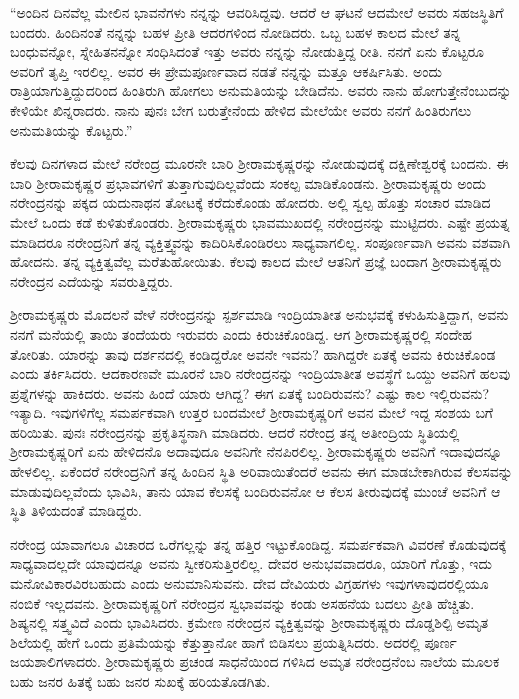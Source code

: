 “ಅಂದಿನ ದಿನವೆಲ್ಲ ಮೇಲಿನ ಭಾವನೆಗಳು ನನ್ನನ್ನು ಆವರಿಸಿದ್ದವು. ಆದರೆ ಆ ಘಟನೆ ಆದಮೇಲೆ ಅವರು ಸಹಜಸ್ಥಿತಿಗೆ ಬಂದರು. ಹಿಂದಿನಂತೆ ನನ್ನನ್ನು ಬಹಳ ಪ್ರೀತಿ ಆದರಗಳಿಂದ ನೋಡಿದರು. ಒಬ್ಬ ಬಹಳ ಕಾಲದ ಮೇಲೆ ತನ್ನ ಬಂಧುವನ್ನೋ, ಸ್ನೇಹಿತನನ್ನೋ ಸಂಧಿಸಿದಂತೆ ಇತ್ತು ಅವರು ನನ್ನನ್ನು ನೋಡುತ್ತಿದ್ದ ರೀತಿ. ನನಗೆ ಏನು ಕೊಟ್ಟರೂ ಅವರಿಗೆ ತೃಪ್ತಿ ಇರಲಿಲ್ಲ. ಅವರ ಈ ಪ್ರೇಮಪೂರ್ಣವಾದ ನಡತೆ ನನ್ನನ್ನು ಮತ್ತೂ ಆಕರ್ಷಿಸಿತು. ಅಂದು ರಾತ್ರಿಯಾಗುತ್ತಿದ್ದುದರಿಂದ ಹಿಂತಿರುಗಿ ಹೋಗಲು ಅನುಮತಿಯನ್ನು ಬೇಡಿದೆನು. ಅವರು ನಾನು ಹೋಗುತ್ತೇನೆಂಬುದನ್ನು ಕೇಳಿಯೇ ಖಿನ್ನರಾದರು. ನಾನು ಪುನಃ ಬೇಗ ಬರುತ್ತೇನೆಂದು ಹೇಳಿದ ಮೇಲೆಯೇ ಅವರು ನನಗೆ ಹಿಂತಿರುಗಲು ಅನುಮತಿಯನ್ನು ಕೊಟ್ಟರು.”

ಕೆಲವು ದಿನಗಳಾದ ಮೇಲೆ ನರೇಂದ್ರ ಮೂರನೇ ಬಾರಿ ಶ‍್ರೀರಾಮಕೃಷ್ಣರನ್ನು ನೋಡುವುದಕ್ಕೆ ದಕ್ಷಿಣೇಶ್ವರಕ್ಕೆ ಬಂದನು. ಈ ಬಾರಿ ಶ‍್ರೀರಾಮಕೃಷ್ಣರ ಪ್ರಭಾವಗಳಿಗೆ ತುತ್ತಾಗುವುದಿಲ್ಲವೆಂದು ಸಂಕಲ್ಪ ಮಾಡಿಕೊಂಡನು. ಶ‍್ರೀರಾಮಕೃಷ್ಣರು ಅಂದು ನರೇಂದ್ರನನ್ನು ಪಕ್ಕದ ಯದುನಾಥನ ತೋಟಕ್ಕೆ ಕರೆದುಕೊಂಡು ಹೋದರು. ಅಲ್ಲಿ ಸ್ವಲ್ಪ ಹೊತ್ತು ಸಂಚಾರ ಮಾಡಿದ ಮೇಲೆ ಒಂದು ಕಡೆ ಕುಳಿತುಕೊಂಡರು. ಶ‍್ರೀರಾಮಕೃಷ್ಣರು ಭಾವಮುಖದಲ್ಲಿ ನರೇಂದ್ರನನ್ನು ಮುಟ್ಟಿದರು. ಎಷ್ಟೇ ಪ್ರಯತ್ನ ಮಾಡಿದರೂ ನರೇಂದ್ರನಿಗೆ ತನ್ನ ವ್ಯಕ್ತಿತ್ತ್ವವನ್ನು ಕಾದಿರಿಸಿಕೊಂಡಿರಲು ಸಾಧ್ಯವಾಗಲಿಲ್ಲ. ಸಂಪೂರ್ಣವಾಗಿ ಅವನು ವಶವಾಗಿ ಹೋದನು. ತನ್ನ ವ್ಯಕ್ತಿತ್ವವೆಲ್ಲ ಮರೆತುಹೋಯಿತು. ಕೆಲವು ಕಾಲದ ಮೇಲೆ ಆತನಿಗೆ ಪ್ರಜ್ಞೆ ಬಂದಾಗ ಶ‍್ರೀರಾಮಕೃಷ್ಣರು ನರೇಂದ್ರನ ಎದೆಯನ್ನು ಸವರುತ್ತಿದ್ದರು.

ಶ‍್ರೀರಾಮಕೃಷ್ಣರು ಮೊದಲನೆ ವೇಳೆ ನರೇಂದ್ರನನ್ನು ಸ್ಪರ್ಶಮಾಡಿ ಇಂದ್ರಿಯಾತೀತ ಅನುಭವಕ್ಕೆ ಕಳುಹಿಸುತ್ತಿದ್ದಾಗ, ಅವನು ನನಗೆ ಮನೆಯಲ್ಲಿ ತಾಯಿ ತಂದೆಯರು ಇರುವರು ಎಂದು ಕಿರುಚಿಕೊಂಡಿದ್ದ. ಆಗ ಶ‍್ರೀರಾಮಕೃಷ್ಣರಲ್ಲಿ ಸಂದೇಹ ತೋರಿತು. ಯಾರನ್ನು ತಾವು ದರ್ಶನದಲ್ಲಿ ಕಂಡಿದ್ದರೋ ಅವನೇ ಇವನು? ಹಾಗಿದ್ದರೇ ಏತಕ್ಕೆ ಅವನು ಕಿರುಚಿಕೊಂಡ ಎಂದು ತರ್ಕಿಸಿದರು. ಆದಕಾರಣವೇ ಮೂರನೆ ಬಾರಿ ನರೇಂದ್ರನನ್ನು ಇಂದ್ರಿಯಾತೀತ ಅವಸ್ಥೆಗೆ ಒಯ್ದು ಅವನಿಗೆ ಹಲವು ಪ್ರಶ್ನೆಗಳನ್ನು ಹಾಕಿದರು. ಅವನು ಹಿಂದೆ ಯಾರು ಆಗಿದ್ದ? ಈಗ ಏತಕ್ಕೆ ಬಂದಿರುವನು? ಎಷ್ಟು ಕಾಲ ಇಲ್ಲಿರುವನು? ಇತ್ಯಾದಿ. ಇವುಗಳಿಗೆಲ್ಲ ಸಮರ್ಪಕವಾಗಿ ಉತ್ತರ ಬಂದಮೇಲೆ ಶ‍್ರೀರಾಮಕೃಷ್ಣರಿಗೆ ಅವನ ಮೇಲೆ ಇದ್ದ ಸಂಶಯ ಬಗೆ ಹರಿಯಿತು. ಪುನಃ ನರೇಂದ್ರನನ್ನು ಪ್ರಕೃತಿಸ್ಥನಾಗಿ ಮಾಡಿದರು. ಆದರೆ ನರೇಂದ್ರ ತನ್ನ ಅತೀಂದ್ರಿಯ ಸ್ಥಿತಿಯಲ್ಲಿ ಶ‍್ರೀರಾಮಕೃಷ್ಣರಿಗೆ ಏನು ಹೇಳಿದನೊ ಅದಾವುದೂ ಅವನಿಗೇ ನೆನಪಿರಲಿಲ್ಲ. ಶ‍್ರೀರಾಮಕೃಷ್ಣರು ಅವನಿಗೆ ಇದಾವುದನ್ನೂ ಹೇಳಲಿಲ್ಲ. ಏಕೆಂದರೆ ನರೇಂದ್ರನಿಗೆ ತನ್ನ ಹಿಂದಿನ ಸ್ಥಿತಿ ಅರಿವಾಯಿತೆಂದರೆ ಅವನು ಈಗ ಮಾಡಬೇಕಾಗಿರುವ ಕೆಲಸವನ್ನು ಮಾಡುವುದಿಲ್ಲವೆಂದು ಭಾವಿಸಿ, ತಾನು ಯಾವ ಕೆಲಸಕ್ಕೆ ಬಂದಿರುವನೋ ಆ ಕೆಲಸ ತೀರುವುದಕ್ಕೆ ಮುಂಚೆ ಅವನಿಗೆ ಆ ಸ್ಥಿತಿ ತಿಳಿಯದಂತೆ ಮಾಡಿದ್ದರು.

ನರೇಂದ್ರ ಯಾವಾಗಲೂ ವಿಚಾರದ ಒರೆಗಲ್ಲನ್ನು ತನ್ನ ಹತ್ತಿರ ಇಟ್ಟುಕೊಂಡಿದ್ದ. ಸಮರ್ಪಕವಾಗಿ ವಿವರಣೆ ಕೊಡುವುದಕ್ಕೆ ಸಾಧ್ಯವಾದಲ್ಲದೇ ಯಾವುದನ್ನೂ ಅವನು ಸ್ವೀಕರಿಸುತ್ತಿರಲಿಲ್ಲ. ದೇವರ ಅನುಭವವಾದರೂ, ಯಾರಿಗೆ ಗೊತ್ತು, ಇದು ಮನೋವಿಕಾರವಿರಬಹುದು ಎಂದು ಅನುಮಾನಿಸುವನು. ದೇವ ದೇವಿಯರು ವಿಗ್ರಹಗಳು ಇವುಗಳಾವುದರಲ್ಲಿಯೂ ನಂಬಿಕೆ ಇಲ್ಲದವನು. ಶ‍್ರೀರಾಮಕೃಷ್ಣರಿಗೆ ನರೇಂದ್ರನ ಸ್ವಭಾವವನ್ನು ಕಂಡು ಅಸಹನೆಯ ಬದಲು ಪ್ರೀತಿ ಹೆಚ್ಚಿತು. ಶಿಷ್ಯನಲ್ಲಿ ಸತ್ತ್ವವಿದೆ ಎಂದು ಭಾವಿಸಿದರು. ಕ್ರಮೇಣ ನರೇಂದ್ರನ ವ್ಯಕ್ತಿತ್ವವನ್ನು ಶ‍್ರೀರಾಮಕೃಷ್ಣರು ದೊಡ್ಡಶಿಲ್ಪಿ ಅಮೃತ ಶಿಲೆಯಲ್ಲಿ ಹೇಗೆ ಒಂದು ಪ್ರತಿಮೆಯನ್ನು ಕೆತ್ತುತ್ತಾನೋ ಹಾಗೆ ಬಿಡಿಸಲು ಪ್ರಯತ್ನಿಸಿದರು. ಅದರಲ್ಲಿ ಪೂರ್ಣ ಜಯಶಾಲಿಗಳಾದರು. ಶ‍್ರೀರಾಮಕೃಷ್ಣರು ಪ್ರಚಂಡ ಸಾಧನೆಯಿಂದ ಗಳಿಸಿದ ಅಮೃತ ನರೇಂದ್ರನೆಂಬ ನಾಲೆಯ ಮೂಲಕ ಬಹು ಜನರ ಹಿತಕ್ಕೆ ಬಹು ಜನರ ಸುಖಕ್ಕೆ ಹರಿಯತೊಡಗಿತು.

